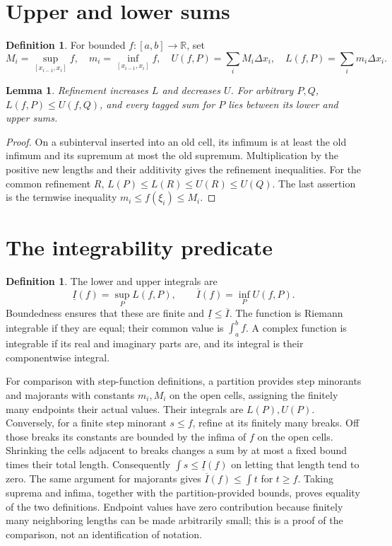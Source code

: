 \documentclass[11pt,oneside,a4paper]{book}
\newtheorem{lemma}[theorem]{Lemma}
\theoremstyle{definition}
\newtheorem{definition}[theorem]{Definition}
\theoremstyle{remark}
\newcommand{\R}{\mathbb R}
\newcommand{\KEntry}[2]{\Needspace{7\baselineskip}\section{#2}\label{#1}{\small\sffamily\color{black!60}\detokenize{#1}}\par}
\begin{document}
\KEntry{K03.08.darboux_sums}{Upper and lower sums}
\begin{definition}
For bounded $f:[a,b]\to\R$, set
\[M_i=\sup_{[x_{i-1},x_i]}f,\quad m_i=\inf_{[x_{i-1},x_i]}f,\quad
 U(f,P)=\sum_iM_i\Delta x_i,\quad L(f,P)=\sum_im_i\Delta x_i.
\]
\end{definition}
\begin{lemma}
Refinement increases $L$ and decreases $U$. For arbitrary $P,Q$,
$L(f,P)\le U(f,Q)$, and every tagged sum for $P$ lies between its
lower and upper sums.
\end{lemma}
\begin{proof}
On a subinterval inserted into an old cell, its infimum is at least the old
infimum and its supremum at most the old supremum. Multiplication by the
positive new lengths and their additivity gives the refinement inequalities.
For the common refinement $R$, $L(P)\le L(R)\le U(R)\le U(Q)$.
The last assertion is the termwise inequality $m_i\le f(\xi_i)\le M_i$.
\end{proof}

\KEntry{K03.08.integral}{The integrability predicate}
\begin{definition}
The lower and upper integrals are
\[\underline{I}(f)=\sup_P L(f,P),\qquad
\overline{I}(f)=\inf_P U(f,P).
\]
Boundedness ensures that these are finite and $\underline I\le\overline I$.
The function is Riemann integrable if they are equal; their common value
is $\int_a^bf$. A complex function is integrable if its real and imaginary
parts are, and its integral is their componentwise integral.
\end{definition}
For comparison with step-function definitions, a partition provides step
minorants and majorants with constants $m_i,M_i$ on the open cells,
assigning the finitely many endpoints their actual values. Their integrals
are $L(P),U(P)$. Conversely, for a finite step minorant $s\le f$, refine
at its finitely many breaks. Off those breaks its constants are bounded by
the infima of $f$ on the open cells. Shrinking the cells adjacent to breaks
changes a sum by at most a fixed bound times their total length. Consequently
$\int s\le\underline I(f)$ on letting that length tend to zero. The same
argument for majorants gives $\overline I(f)\le\int t$ for $t\ge f$.
Taking suprema and infima, together with the partition-provided bounds,
proves equality of the two definitions. Endpoint values have zero contribution
because finitely many neighboring lengths can be made arbitrarily small;
this is a proof of the comparison, not an identification of notation.
\end{document}
